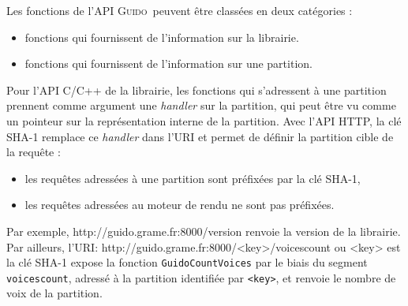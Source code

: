 \documentclass{article}
\newenvironment{code}		{\vspace{-2mm} \fontsize{8.5pt}{12pt}\selectfont \verbatim}{\endverbatim\vspace{-2mm}}
\newcommand{\guido}		{\textsc{Guido}}
\begin{document}
Les fonctions de l'API \guido\ peuvent être classées en deux catégories :
\begin{itemize}[noitemsep]
\item fonctions qui fournissent de l'information sur la librairie.
\item fonctions qui fournissent de l'information sur une partition.
\end{itemize}

Pour l'API C/C++ de la librairie, les fonctions qui s'adressent à une partition prennent comme argument une \emph{handler} sur la partition, qui peut être vu comme un pointeur sur la représentation interne de la partition. Avec l'API HTTP, la clé SHA-1 remplace ce \emph{handler} dans l'URI et permet de définir la partition cible de la requête :
\begin{itemize}[noitemsep]
\item les requêtes adressées à une partition sont préfixées par la clé SHA-1,
\item les requêtes adressées au moteur de rendu ne sont pas préfixées.
\end{itemize}
Par exemple,
\begin{code}
  http://guido.grame.fr:8000/version
\end{code}
renvoie la version de la librairie. Par ailleurs, l'URI:
\begin{code}
  http://guido.grame.fr:8000/<key>/voicescount
         ou <key> est la clé SHA-1
\end{code}
expose la fonction \verb=GuidoCountVoices= par le biais du segment \verb=voicescount=, adressé à la partition identifiée par \verb=<key>=, et renvoie le nombre de voix de la partition.
\end{document}
